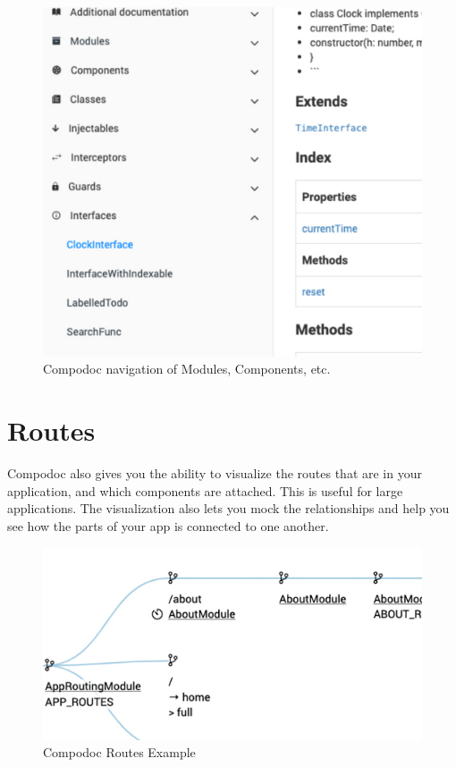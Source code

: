 \begin{figure}
\caption{Compodoc navigation of Modules, Components, etc.}
\includegraphics[width=414pt]{graphics/compodoc/nav/compodoc-nav-screenshot.pdf}
\end{figure}

\section{Routes}
Compodoc also gives you the ability to visualize the routes that are in your application, and which components are attached. This is useful for large applications. The visualization also lets you mock the relationships and help you see how the parts of your app is connected to one another. 

\begin{figure}
\caption{Compodoc Routes Example}
\includegraphics[width=414pt]{graphics/compodoc/routes/compodoc-routes.pdf}
\end{figure}

